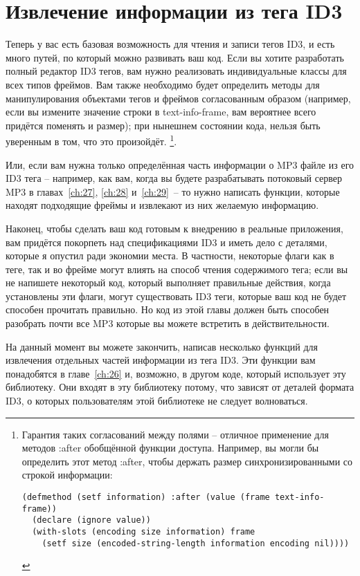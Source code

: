 \section{Извлечение информации из тега ID3}

Теперь у вас есть базовая возможность для чтения и записи тегов ID3, и есть много путей,
по который можно развивать ваш код. Если вы хотите разработать полный редактор ID3 тегов,
вам нужно реализовать индивидуальные классы для всех типов фреймов. Вам также необходимо
будет определить методы для манипулирования объектами тегов и фреймов согласованным
образом (например, если вы измените значение строки в text-info-frame, вам вероятнее всего
придётся поменять и размер); при нынешнем состоянии кода, нельзя быть уверенным в том, что
это произойдёт. \footnote{Гарантия таких согласований между полями -- отличное применение
  для методов :after обобщённой функции доступа. Например, вы могли бы определить этот
  метод :after, чтобы держать размер синхронизированными со строкой информации:

\begin{lstlisting}
(defmethod (setf information) :after (value (frame text-info-frame))
  (declare (ignore value))
  (with-slots (encoding size information) frame
    (setf size (encoded-string-length information encoding nil))))
\end{lstlisting}
}.

Или, если вам нужна только определённая часть информации о MP3 файле из его ID3 тега --
например, как вам, когда вы будете разрабатывать потоковый сервер MP3 в
главах~\ref{ch:27}, \ref{ch:28} и~\ref{ch:29}~-- то нужно написать функции, которые
находят подходящие фреймы и извлекают из них желаемую информацию.

Наконец, чтобы сделать ваш код готовым к внедрению в реальные приложения, вам придётся
покорпеть над спецификациями ID3 и иметь дело с деталями, которые я опустил ради экономии
места. В частности, некоторые флаги как в теге, так и во фрейме могут влиять на способ
чтения содержимого тега; если вы не напишете некоторый код, который выполняет правильные
действия, когда установлены эти флаги, могут существовать ID3 теги, которые ваш код не
будет способен прочитать правильно. Но код из этой главы должен быть способен разобрать
почти все MP3 которые вы можете встретить в действительности.

На данный момент вы можете закончить, написав несколько функций для извлечения отдельных
частей информации из тега ID3. Эти функции вам понадобятся в главе~\ref{ch:26} и,
возможно, в другом коде, который использует эту библиотеку. Они входят в эту библиотеку
потому, что зависят от деталей формата ID3, о которых пользователям этой библиотеке не
следует волноваться.

